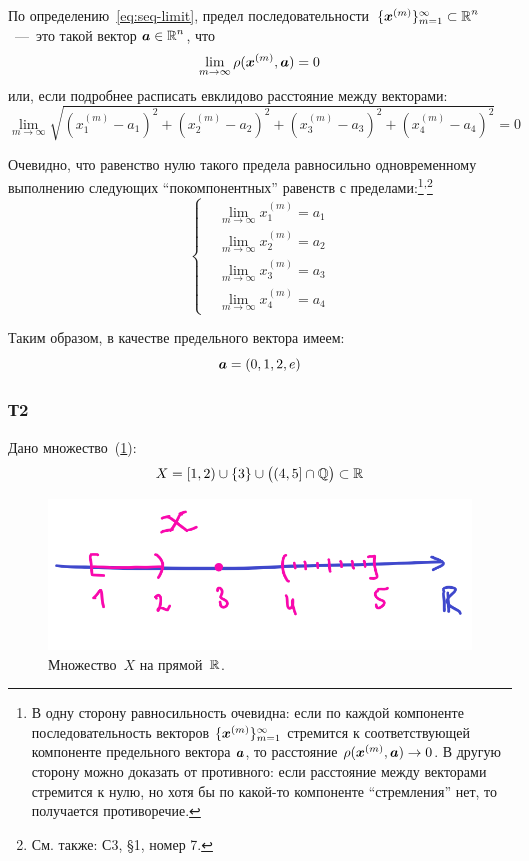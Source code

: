\documentclass[a4paper,12pt]{article}
\begin{document}
  \begin{solution}
    По определению~\eqref{eq:seq-limit}, предел последовательности~$\{\bds x^{(m)}\}_{m = 1}^{\infty} \hm\subset \RR^n$~---~это такой вектор $\bds a \hm\in \RR^n$, что
    \[
      \lim_{m \to \infty} \rho(\boldsymbol x^{(m)}, \boldsymbol a) = 0
    \]
    или, если подробнее расписать евклидово расстояние между векторами:
    \[
      \lim_{m \to \infty} \sqrt{
        \left(x^{(m)}_1 - a_1\right)^2
        + \left(x^{(m)}_2 - a_2\right)^2
        + \left(x^{(m)}_3 - a_3\right)^2
        + \left(x^{(m)}_4 - a_4\right)^2} = 0
    \]

    Очевидно, что равенство нулю такого предела равносильно одновременному выполнению следующих ``покомпонентных'' равенств с пределами:\footnote{
      В одну сторону равносильность очевидна: если по каждой компоненте последовательность векторов $\{\boldsymbol x^{(m)}\}_{m = 1}^{\infty}$ стремится к соответствующей компоненте предельного вектора $\boldsymbol a$, то расстояние $\rho(\bds x^{(m)}, \bds a) \hm\to 0$.
      В другую сторону можно доказать от противного: если расстояние между векторами стремится к нулю, но хотя бы по какой-то компоненте ``стремления'' нет, то получается противоречие.
    }\textsuperscript{,}\footnote{
      См. также: С3, \S 1, номер 7.
    }
    \[
      \left\{
        \begin{aligned}
          &\lim_{m \to \infty} x^{(m)}_1 = a_1\\
          &\lim_{m \to \infty} x^{(m)}_2 = a_2\\
          &\lim_{m \to \infty} x^{(m)}_3 = a_3\\
          &\lim_{m \to \infty} x^{(m)}_4 = a_4
        \end{aligned}
      \right.
    \]

    Таким образом, в качестве предельного вектора имеем:
    \[
      \boldsymbol a = \left(
        0, 1, 2, e
      \right)
    \]
  \end{solution}

  
  \subsubsection{Т2}

  Дано множество~(\ref{fig:X-subset-on-R}):
  \[
    X = [1, 2) \cup \{3\} \cup \bigl((4, 5] \cap \mathbb Q\bigr) \subset \operatorname{\mathbb R}
  \]

  \begin{figure}[ht]
    \centering
  
    \includegraphics[width=0.5\columnwidth]{X-subset-on-R}
  
    \caption{
      Множество~$X$ на прямой~$\operatorname{\mathbb R}$.
    }
    \label{fig:X-subset-on-R}
  \end{figure}
\end{document}
